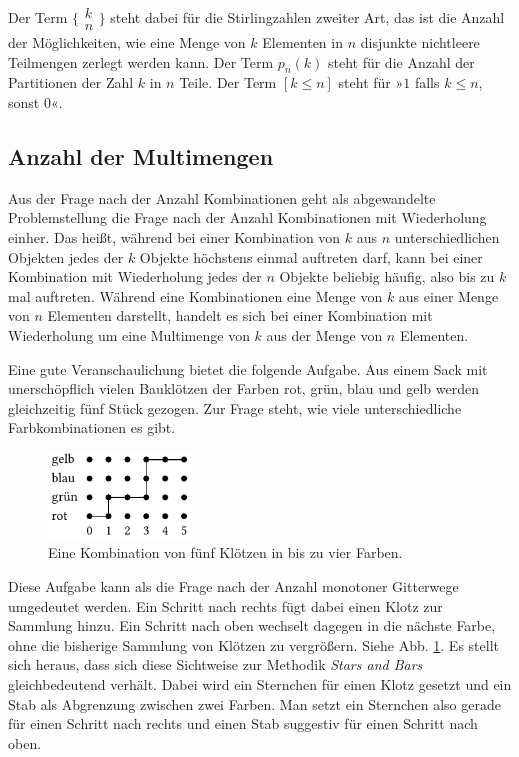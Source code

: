 Der Term $\big\{\!\begin{smallmatrix}k\\ n\end{smallmatrix}\!\big\}$
steht dabei für die Stirlingzahlen zweiter Art, das ist die Anzahl der
Möglichkeiten, wie eine Menge von $k$ Elementen in $n$ disjunkte nichtleere
Teilmengen zerlegt werden kann. Der Term $p_n(k)$ steht für die Anzahl
der Partitionen der Zahl $k$ in $n$ Teile. Der Term $[k\le n]$ steht
für »$1$ falls $k\le n$, sonst $0$«.

\subsection{Anzahl der Multimengen}

Aus der Frage nach der Anzahl Kombinationen geht als abgewandelte
Problemstellung die Frage nach der Anzahl Kombinationen mit
Wiederholung einher. Das heißt, während bei einer Kombination von
$k$ aus $n$ unterschiedlichen Objekten jedes der $k$ Objekte höchstens
einmal auftreten darf, kann bei einer Kombination mit Wiederholung
jedes der $n$ Objekte beliebig häufig, also bis zu $k$ mal auftreten.
Während eine Kombinationen eine Menge von $k$ aus einer Menge von $n$
Elementen darstellt, handelt es sich bei einer Kombination mit
Wiederholung um eine Multimenge von $k$ aus der Menge von $n$ Elementen.

Eine gute Veranschaulichung bietet die folgende Aufgabe.
Aus einem Sack mit unerschöpflich vielen Bauklötzen der Farben rot, grün,
blau und gelb werden gleichzeitig fünf Stück gezogen. Zur Frage steht,
wie viele unterschiedliche Farbkombinationen es gibt.

\begin{figure}\setlength{\abovecaptionskip}{0pt}
\begin{center}
\includegraphics[width=38mm]{img/Kloetze.pdf}
\caption{Eine Kombination von fünf Klötzen in bis zu vier Farben.}
\label{fig:Kloetze}
\end{center}
\end{figure}

Diese Aufgabe kann als die Frage nach der Anzahl monotoner Gitterwege
umgedeutet werden. Ein Schritt nach rechts fügt dabei einen Klotz zur
Sammlung hinzu. Ein Schritt nach oben wechselt dagegen in die nächste Farbe,
ohne die bisherige Sammlung von Klötzen zu vergrößern.
Siehe Abb. \ref{fig:Kloetze}. Es stellt sich heraus, dass sich diese Sichtweise
zur Methodik \emph{Stars and Bars} gleichbedeutend verhält. Dabei wird
ein Sternchen für einen Klotz gesetzt und ein Stab als Abgrenzung
zwischen zwei Farben. Man setzt ein Sternchen also gerade für einen
Schritt nach rechts und einen Stab suggestiv für einen Schritt
nach oben.

